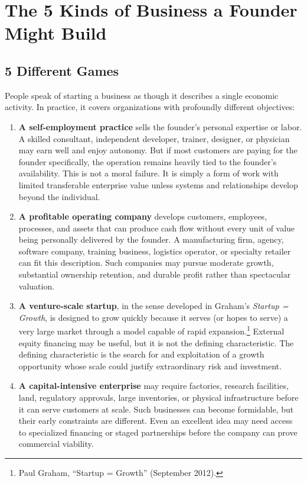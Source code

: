 \section{The 5 Kinds of Business a Founder Might Build}

\subsection{5 Different Games}

People speak of starting a business as though it describes a single economic activity. In practice, it covers organizations with profoundly different objectives:

\begin{enumerate}[label=\textbf{\arabic*.},leftmargin=11pt,itemsep=1.5pt,topsep=1.5pt,parsep=0pt]
  \item \textbf{A self-employment practice} sells the founder's personal expertise or labor. A skilled consultant, independent developer, trainer, designer, or physician may earn well and enjoy autonomy. But if most customers are paying for the founder specifically, the operation remains heavily tied to the founder's availability. This is not a moral failure. It is simply a form of work with limited transferable enterprise value unless systems and relationships develop beyond the individual.
  \item \textbf{A profitable operating company} develops customers, employees, processes, and assets that can produce cash flow without every unit of value being personally delivered by the founder. A manufacturing firm, agency, software company, training business, logistics operator, or specialty retailer can fit this description. Such companies may pursue moderate growth, substantial ownership retention, and durable profit rather than spectacular valuation.
  \item \textbf{A venture-scale startup}, in the sense developed in Graham's \textit{Startup = Growth}, is designed to grow quickly because it serves (or hopes to serve) a very large market through a model capable of rapid expansion.\footnote{Paul Graham, ``Startup = Growth'' (September 2012).} External equity financing may be useful, but it is not the defining characteristic. The defining characteristic is the search for and exploitation of a growth opportunity whose scale could justify extraordinary risk and investment.
  \item \textbf{A capital-intensive enterprise} may require factories, research facilities, land, regulatory approvals, large inventories, or physical infrastructure before it can serve customers at scale. Such businesses can become formidable, but their early constraints are different. Even an excellent idea may need access to specialized financing or staged partnerships before the company can prove commercial viability.

\end{enumerate}

